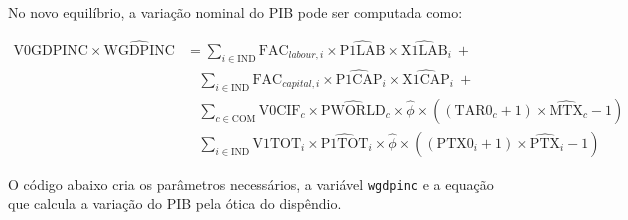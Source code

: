 \documentclass[12pt,twoside]{article}
\newenvironment{Shaded}{\begin{snugshade}}{\end{snugshade}}
\newcommand{\DataTypeTok}[1]{\textcolor[rgb]{0.13,0.29,0.53}{#1}}
\newcommand{\KeywordTok}[1]{\textcolor[rgb]{0.13,0.29,0.53}{\textbf{#1}}}
\newcommand{\NormalTok}[1]{#1}
\newcommand{\OperatorTok}[1]{\textcolor[rgb]{0.81,0.36,0.00}{\textbf{#1}}}
\newcommand{\StringTok}[1]{\textcolor[rgb]{0.31,0.60,0.02}{#1}}
\let\oldShaded\Shaded
\let\endoldShaded\endShaded
\renewenvironment{Shaded}{\footnotesize\oldShaded}{\endoldShaded}
\begin{document}
\begin{Shaded}
\end{Shaded}

No novo equilíbrio, a variação nominal do PIB pode ser computada como:

\[
\begin{aligned}
\text{V0GDPINC} \times \hat{\text{WGDPINC}} & =  \sum_{i \in \text{IND}} \text{FAC}_{labour,i} \times \hat{\text{P1LAB}} \times \hat{\text{X1LAB}}_i~ + \\
~ & ~~~~\sum_{i \in \text{IND}} \text{FAC}_{capital,i} \times \hat{\text{P1CAP}}_i \times \hat{\text{X1CAP}}_i~ + \\
~ & ~~~~ \sum_{c \in \text{COM}} \text{V0CIF}_c \times \hat{\text{PWORLD}}_c \times \hat{\phi} \times ((\text{TAR0}_c + 1) \times \hat{\text{MTX}}_c - 1) \\
~ & ~~~~ \sum_{i \in \text{IND}} \text{V1TOT}_i \times \hat{\text{P1TOT}}_i \times \hat{\phi} \times ((\text{PTX0}_i + 1) \times \hat{\text{PTX}}_i - 1)
\end{aligned}
\]

O código abaixo cria os parâmetros necessários, a variável
\texttt{wgdpinc} e a equação que calcula a variação do PIB pela ótica do
dispêndio.

\begin{Shaded}
\end{Shaded}
\end{document}
